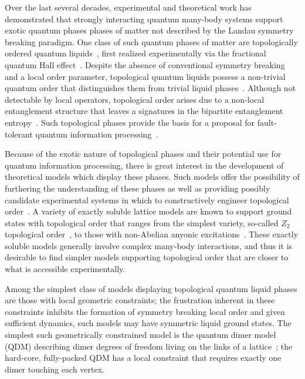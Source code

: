 \documentclass[twocolumn,prb,aps,floatfix,superscriptaddress]{revtex4-1}
\begin{document}
Over the last several decades, experimental and theoretical work has demonstrated that strongly interacting quantum many-body systems support exotic quantum phases phases of matter not described by the Landau symmetry breaking paradigm. One class of such quantum phases of matter are topologically ordered quantum liquids~\cite{Wen1990}, first realized experimentally via the fractional quantum Hall effect~\cite{FQHE????}. Despite the absence of conventional symmetry breaking and a local order parameter, topological quantum liquids possess a non-trivial quantum order that distinguishes them from trivial liquid phases~\cite{Nayak2008}. Although not detectable by local operators, topological order arises due to a non-local entanglement structure that leaves a signatures in the bipartite entanglement entropy~\cite{Levin2006a,Kitaev2006b}. Such topological phases provide the basis for a proposal for fault-tolerant quantum information processing~\cite{Freedman2001,Kitaev2003}.

Because of the exotic nature of topological phases and their potential use for quantum information processing, there is great interest in the development of theoretical models which display these phases. Such models offer the possibility of furthering the understanding of these phases as well as providing possibly candidate experimental systems in which to constructively engineer topological order~\cite{Duan2003,Jaksch2005,Lewenstein2007,Jiang2008d,Weimer2010a,Herdman2010c,Martinis2015}. A variety of exactly soluble lattice models are known to support ground states with topological order that ranges from the simplest variety, so-called $Z_2$ topological order~\cite{Kitaev2003,Wen2003}, to those with non-Abelian anyonic excitations~\cite{Levin2005a,Kitaev2006a}. These exactly soluble models generally involve complex many-body interactions, and thus it is desirable to find simpler models supporting topological order that are closer to what is accessible experimentally.

Among the simplest class of models displaying topological quantum liquid phases are those with local geometric constraints; the frustration inherent in these constraints inhibits the formation of symmetry breaking local order and given sufficient dynamics, such models may have symmetric liquid ground states. The simplest such geometrically constrained model is the quantum dimer model (QDM) describing dimer degrees of freedom living on the links of a lattice~\cite{Rokhsar1988,Moessner2008}; the hard-core, fully-packed QDM has a local constraint that requires exactly one dimer touching each vertex.
\end{document}
